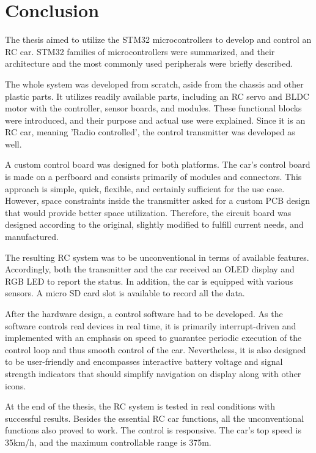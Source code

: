 


\part{Conclusion}
\label{chap:conclusion}
The thesis aimed to utilize the STM32 microcontrollers to develop and control an RC car. STM32 families of microcontrollers were summarized, and their architecture and the most commonly used peripherals were briefly described.

The whole system was developed from scratch, aside from the chassis and other plastic parts. It utilizes readily available parts, including an RC servo and BLDC motor with the controller, sensor boards, and modules. These functional blocks were introduced, and their purpose and actual use were explained. Since it is an RC car, meaning 'Radio controlled', the control transmitter was developed as well.

A custom control board was designed for both platforms. The car's control board is made on a perfboard and consists primarily of modules and connectors. This approach is simple, quick, flexible, and certainly sufficient for the use case. However, space constraints inside the transmitter asked for a custom PCB design that would provide better space utilization. Therefore, the circuit board was designed according to the original, slightly modified to fulfill current needs, and manufactured.

The resulting RC system was to be unconventional in terms of available features. Accordingly, both the transmitter and the car received an OLED display and RGB LED to report the status. In addition, the car is equipped with various sensors. A micro SD card slot is available to record all the data.

After the hardware design, a control software had to be developed. As the software controls real devices in real time, it is primarily interrupt-driven and implemented with an emphasis on speed to guarantee periodic execution of the control loop and thus smooth control of the car. Nevertheless, it is also designed to be user-friendly and encompasses interactive battery voltage and signal strength indicators that should simplify navigation on display along with other icons.

At the end of the thesis, the RC system is tested in real conditions with successful results. Besides the essential RC car functions, all the unconventional functions also proved to work. The control is responsive. The car's top speed is 35km/h, and the maximum controllable range is 375m.

